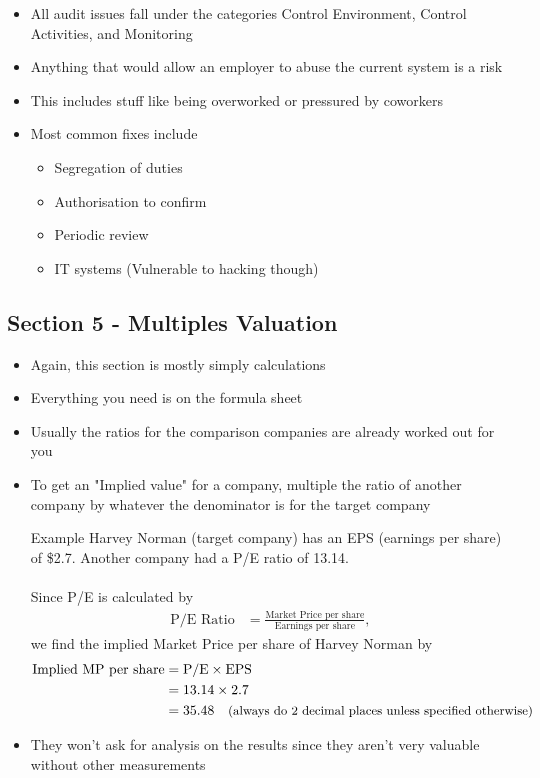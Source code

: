 \documentclass{article}
\begin{document}
		\begin{itemize}
			\item All audit issues fall under the categories Control Environment, Control Activities, and Monitoring
			\item Anything that would allow an employer to abuse the current system is a risk
			\item This includes stuff like being overworked or pressured by coworkers
			\item Most common fixes include
				\begin{itemize}
					\item Segregation of duties
					\item Authorisation to confirm
					\item Periodic review
					\item IT systems (Vulnerable to hacking though)
				\end{itemize}
		\end{itemize}

	\subsection{Section 5 - Multiples Valuation}

		\begin{itemize}
			\item Again, this section is mostly simply calculations
			\item Everything you need is on the formula sheet
			\item Usually the ratios for the comparison companies are already worked out for you
			\item To get an "Implied value" for a company, multiple the ratio of another company by whatever the denominator is for the target company
				\begin{question}{Example}
					Harvey Norman (target company) has an EPS (earnings per share) of \$2.7. Another company had a P/E ratio of 13.14.
					\\ \\
					Since P/E is calculated by
					\begin{align*}
						\text{P/E Ratio} &= \frac{\text{Market Price per share}}{\text{Earnings per share}},
					\end{align*}
					we find the implied Market Price per share of Harvey Norman by
					\begin{align*}
						\text{Implied MP per share} &= \text{P/E} \times \text{EPS}	\\
													&= 13.14 \times 2.7				\\
													&= 35.48 \quad \text{\small(always do 2 decimal places unless specified otherwise)}
					\end{align*}
				\end{question}
			\item They won't ask for analysis on the results since they aren't very valuable without other measurements
		\end{itemize}
\end{document}
